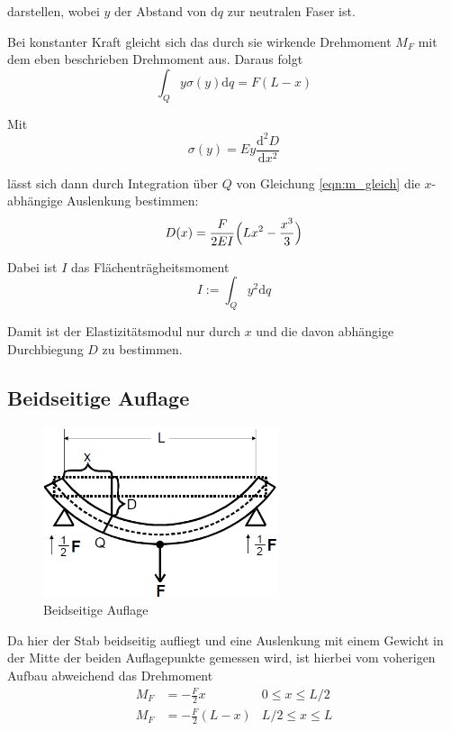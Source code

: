 darstellen, wobei $y$ der Abstand von $\text{d}q$ zur neutralen Faser ist.

Bei konstanter Kraft gleicht sich das durch sie wirkende Drehmoment $M_F$ mit dem eben beschrieben Drehmoment aus. Daraus folgt \begin{equation}
    \label{eqn:m_gleich}
    \int_Q y\sigma(y)\text{d}q = F (L - x) 
\end{equation}

Mit \begin{equation}
    \sigma (y) = E y \frac{\text{d}^2 D}{\text{d} x^2}
\end{equation}

lässt sich dann durch Integration über $Q$ von Gleichung \eqref{eqn:m_gleich} die $x$- abhängige Auslenkung bestimmen:
\begin{equation}
    D(x) = \frac{F}{2EI} \Bigl( L x^2 - \frac{x^3}3 \Bigr)
    \label{eqn:D1_gleich}
\end{equation}

Dabei ist $I$ das Flächenträgheitsmoment \begin{equation}
    I := \int_Q y^2 \text{d}q
    \label{eqn:I}
\end{equation}

Damit ist der Elastizitätsmodul nur durch $x$ und die davon abhängige Durchbiegung $D$ zu bestimmen.

\subsection{Beidseitige Auflage}
\begin{figure}
    \centering
    \includegraphics[height=5cm]{data/bild_2}
    \caption{Beidseitige Auflage}
    \label{fig:2th}
\end{figure}

\FloatBarrier

Da hier der Stab beidseitig aufliegt und eine Auslenkung mit einem Gewicht in der Mitte der beiden Auflagepunkte gemessen wird, ist hierbei
vom voherigen Aufbau abweichend das Drehmoment \begin{align}
M_F &= - \frac{F}2 x       &   0 \leq x \leq L/2 \\
M_F &= - \frac{F}2 (L - x) & L/2 \leq x \leq L
\end{align}

